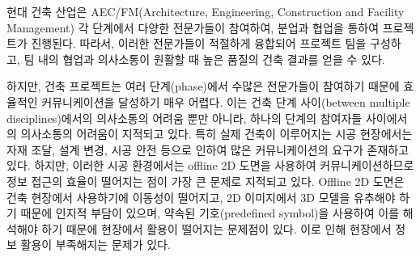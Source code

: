 
현대 건축 산업은 AEC/FM(Architecture, Engineering, Construction and Facility Management) 각 단계에서 다양한 전문가들이 참여하여, 분업과 협업을 통하여 프로젝트가 진행된다. 따라서, 이러한 전문가들이 적절하게 융합되어 프로젝트 팀을 구성하고\cite{hollenbeck_multilevel_1995}, 팀 내의 협업과 의사소통이 원활할 때 높은 품질의 건축 결과를 얻을 수 있다\cite{kwon_defect_2014,lin_using_2014,yeh_-site_2012}.

하지만, 건축 프로젝트는 여러 단계(phase)에서 수많은 전문가들이 참여하기 때문에 효율적인 커뮤니케이션을 달성하기 매우 어렵다\cite{ishii_augmented_2002,klein_imaged-based_2012,chi_development_2012,lin_using_2014}. 이는 건축 단계 사이(between multiple disciplines)에서의 의사소통의 어려움\cite{machino_remote-collaboration_2006,wagner_building_2012,lin_using_2014} 뿐만 아니라, 하나의 단계의 참여자들 사이에서의 의사소통\cite{ishii_augmented_2002,chi_development_2012,song_penlight:_2009,lin_using_2014}의 어려움이 지적되고 있다. 특히 실제 건축이 이루어지는 시공 현장에서는 자재 조달\cite{hollenbeck_multilevel_1995,lin_using_2014}, 설계 변경\cite{song_penlight:_2009}, 시공 안전\cite{bae_high-precision_2013} 등으로 인하여 많은 커뮤니케이션의 요구가 존재하고 있다.
하지만, 이러한 시공 환경에서는 offline 2D 도면을 사용하여 커뮤니케이션하므로 정보 접근의 효율이 떨어지는 점이 가장 큰 문제로 지적되고 있다\cite{yeh_-site_2012,cote_augmented_2013,chi_research_2013}. Offline 2D 도면은 건축 현장에서 사용하기에 이동성이 떨어지고\cite{yeh_-site_2012}, 2D 이미지에서 3D 모델을 유추해야 하기 때문에 인지적 부담이 있으며\cite{cote_augmented_2013,yeh_-site_2012}, 약속된 기호(predefined symbol)을 사용하여 이를 해석\cite{chi_research_2013}해야 하기 때문에 현장에서 활용이 떨어지는 문제점이 있다. 이로 인해 현장에서 정보 활용이 부족해지는 문제가 있다.

